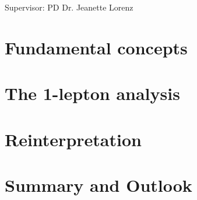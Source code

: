 \documentclass[a4paper,11pt,numbered,pdftex,dvipsnames]{Classes/PhDThesisPSnPDF}
\begin{document}
\frontmatter

\maketitle

\cleardoublepage

\makegermantitle
\newpage
Supervisor: PD\@\xspace Dr.\@\xspace Jeanette Lorenz






\tableofcontents

%




\mainmatter

\listoftodos[Notes]


\part{Fundamental concepts}




\part{The 1-lepton analysis}






\part{Reinterpretation}




\part{Summary and Outlook}

\end{document}
